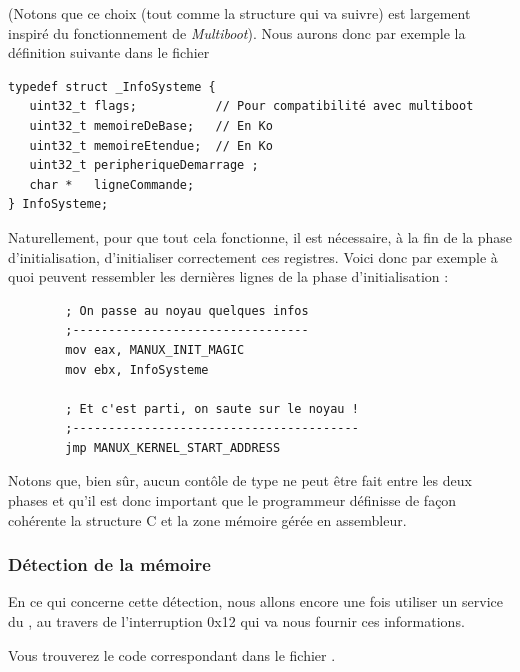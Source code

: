    (Notons que ce choix (tout comme la structure qui va suivre) est
largement inspiré du fonctionnement de {\em Multiboot}). Nous aurons
donc par exemple la définition suivante dans le fichier

\lstset{language=C}
\begin{lstlisting}
typedef struct _InfoSysteme {
   uint32_t flags;           // Pour compatibilité avec multiboot
   uint32_t memoireDeBase;   // En Ko
   uint32_t memoireEtendue;  // En Ko
   uint32_t peripheriqueDemarrage ;
   char *   ligneCommande;
} InfoSysteme;
\end{lstlisting}

   Naturellement, pour que tout cela fonctionne, il est nécessaire, à la fin
de la phase d'initialisation, d'initialiser correctement ces
registres. Voici donc par exemple à quoi peuvent ressembler les
dernières lignes de la phase d'initialisation :

\lstset{language=nasm}

\begin{lstlisting}
        ; On passe au noyau quelques infos
        ;---------------------------------
        mov eax, MANUX_INIT_MAGIC
        mov ebx, InfoSysteme

        ; Et c'est parti, on saute sur le noyau !
        ;----------------------------------------
        jmp MANUX_KERNEL_START_ADDRESS  
\end{lstlisting}

   Notons que, bien sûr, aucun contôle de type ne peut être fait entre les deux
phases et qu'il est donc important que le programmeur définisse de façon
cohérente la structure C et la zone mémoire gérée en assembleur.

\subsubsection{Détection de la mémoire}

   En ce qui concerne cette détection, nous allons encore une fois
utiliser un service du \bios, au travers de l'interruption 0x12 qui va
nous fournir ces informations.

   Vous trouverez le code correspondant dans le fichier
. 


%
